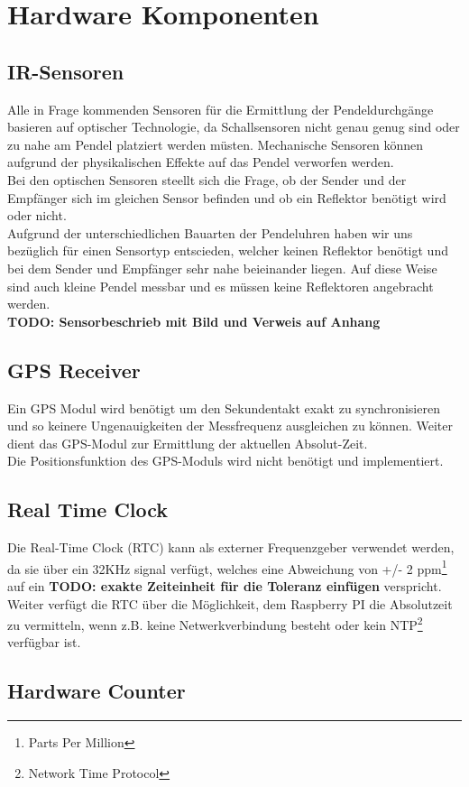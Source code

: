 \section{Hardware Komponenten}
\subsection{IR-Sensoren}
	Alle in Frage kommenden Sensoren für die Ermittlung der Pendeldurchgänge basieren auf optischer Technologie, da Schallsensoren nicht genau genug sind oder zu nahe am Pendel platziert werden müsten. Mechanische Sensoren können aufgrund der physikalischen Effekte auf das Pendel verworfen werden.\\
	 Bei den optischen Sensoren steellt sich die Frage, ob der Sender und der Empfänger sich im gleichen Sensor befinden und ob ein Reflektor benötigt wird oder nicht.\\
	Aufgrund der unterschiedlichen Bauarten der Pendeluhren haben wir uns bezüglich für einen Sensortyp entscieden, welcher keinen Reflektor benötigt und bei dem Sender und Empfänger sehr nahe beieinander liegen. Auf diese Weise sind auch kleine Pendel messbar und es müssen keine Reflektoren angebracht werden.\\
	\textbf{TODO: Sensorbeschrieb mit Bild und Verweis auf Anhang}
\subsection{GPS Receiver}
	Ein GPS Modul wird benötigt um den Sekundentakt exakt zu synchronisieren und so keinere Ungenauigkeiten der Messfrequenz ausgleichen zu können. Weiter dient das GPS-Modul zur Ermittlung der aktuellen Absolut-Zeit.\\
	Die Positionsfunktion des GPS-Moduls wird nicht benötigt und implementiert.
\subsection{Real Time Clock}
	Die Real-Time Clock (RTC) kann als externer Frequenzgeber verwendet werden, da sie über ein 32KHz signal verfügt, welches eine Abweichung von +/- 2 ppm\footnote{Parts Per Million} auf ein \textbf{TODO: exakte Zeiteinheit für die Toleranz einfügen} verspricht.\\
	Weiter verfügt die RTC über die Möglichkeit, dem Raspberry PI die Absolutzeit zu vermitteln, wenn z.B. keine Netwerkverbindung besteht oder kein NTP\footnote{Network Time Protocol} verfügbar ist.
\subsection{Hardware Counter}
